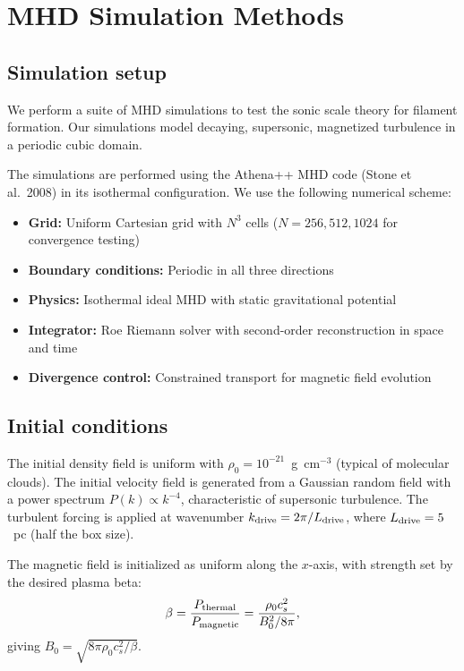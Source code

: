\documentclass{mnras}
\begin{document}

\section{MHD Simulation Methods}

\subsection{Simulation setup}

We perform a suite of MHD simulations to test the sonic scale theory for filament formation. Our simulations model decaying, supersonic, magnetized turbulence in a periodic cubic domain.

The simulations are performed using the Athena++ MHD code (Stone et al.~2008) in its isothermal configuration. We use the following numerical scheme:

\begin{itemize}
\item \textbf{Grid:} Uniform Cartesian grid with $N^3$ cells ($N = 256, 512, 1024$ for convergence testing)
\item \textbf{Boundary conditions:} Periodic in all three directions
\item \textbf{Physics:} Isothermal ideal MHD with static gravitational potential
\item \textbf{Integrator:} Roe Riemann solver with second-order reconstruction in space and time
\item \textbf{Divergence control:} Constrained transport for magnetic field evolution
\end{itemize}

\subsection{Initial conditions}

The initial density field is uniform with $\rho_0 = 10^{-21}$~g~cm$^{-3}$ (typical of molecular clouds). The initial velocity field is generated from a Gaussian random field with a power spectrum $P(k) \propto k^{-4}$, characteristic of supersonic turbulence. The turbulent forcing is applied at wavenumber $k_{\rm drive} = 2\pi / L_{\rm drive}$, where $L_{\rm drive} = 5$~pc (half the box size).

The magnetic field is initialized as uniform along the $x$-axis, with strength set by the desired plasma beta:
\begin{equation}
\beta = \frac{P_{\rm thermal}}{P_{\rm magnetic}} = \frac{\rho_0 c_s^2}{B_0^2 / 8\pi},
\end{equation}
giving $B_0 = \sqrt{8\pi \rho_0 c_s^2 / \beta}$.
\end{document}

